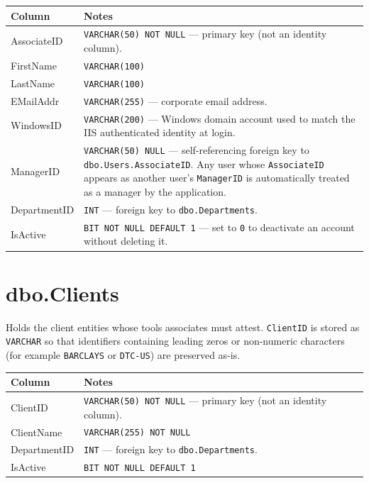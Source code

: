 \documentclass[12pt,a4paper]{report}
\begin{document}
\begin{longtable}{>{\ttfamily}p{4.5cm} >{\raggedright\arraybackslash}p{9.5cm}}
\toprule
\normalfont\textbf{Column} & \textbf{Notes} \\
\midrule
\endhead
AssociateID & \texttt{VARCHAR(50) NOT NULL} — primary key (not an identity column). \\
FirstName   & \texttt{VARCHAR(100)} \\
LastName    & \texttt{VARCHAR(100)} \\
EMailAddr   & \texttt{VARCHAR(255)} — corporate email address. \\
WindowsID   & \texttt{VARCHAR(200)} — Windows domain account used to match the IIS
              authenticated identity at login. \\
ManagerID   & \texttt{VARCHAR(50) NULL} — self-referencing foreign key to
              \texttt{dbo.Users.AssociateID}. Any user whose \texttt{AssociateID} appears as
              another user's \texttt{ManagerID} is automatically treated as a manager by the
              application. \\
DepartmentID & \texttt{INT} — foreign key to \texttt{dbo.Departments}. \\
IsActive    & \texttt{BIT NOT NULL DEFAULT 1} — set to \texttt{0} to deactivate an account
              without deleting it. \\
\bottomrule
\end{longtable}

\section{dbo.Clients}

Holds the client entities whose tools associates must attest. \texttt{ClientID} is stored as
\texttt{VARCHAR} so that identifiers containing leading zeros or non-numeric characters (for
example \texttt{BARCLAYS} or \texttt{DTC-US}) are preserved as-is.

\begin{longtable}{>{\ttfamily}p{4.5cm} >{\raggedright\arraybackslash}p{9.5cm}}
\toprule
\normalfont\textbf{Column} & \textbf{Notes} \\
\midrule
\endhead
ClientID     & \texttt{VARCHAR(50) NOT NULL} — primary key (not an identity column). \\
ClientName   & \texttt{VARCHAR(255) NOT NULL} \\
DepartmentID & \texttt{INT} — foreign key to \texttt{dbo.Departments}. \\
IsActive     & \texttt{BIT NOT NULL DEFAULT 1} \\
\bottomrule
\end{longtable}
\end{document}
